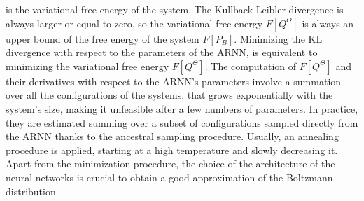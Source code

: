 \documentclass[aps,physrev,10pt,floatfix,reprint]{revtex4-2}
\begin{document}
is the variational free energy of the system. The Kullback-Leibler divergence is always larger or equal to zero, so the variational free energy $F[Q^{\Theta}]$ is always an upper bound of the free energy of the system $F[P_{B}]$. Minimizing the KL divergence with respect to the parameters of the ARNN, is equivalent to minimizing the variational free energy $F[Q^{\Theta}]$. The computation of $F[Q^{\Theta}]$ and their derivatives with respect to the ARNN's parameters involve a summation over all the configurations of the systems, that grows exponentially with the system's size, making it unfeasible after a few numbers of parameters. In practice, they are estimated summing over a subset of configurations sampled directly from the ARNN thanks to the ancestral sampling procedure\cite{Wu2019}. Usually, an annealing procedure is applied, starting at a high temperature and slowly decreasing it.
Apart from the minimization procedure, the choice of the architecture of the neural networks is crucial to obtain a good approximation of the Boltzmann distribution.
\end{document}
